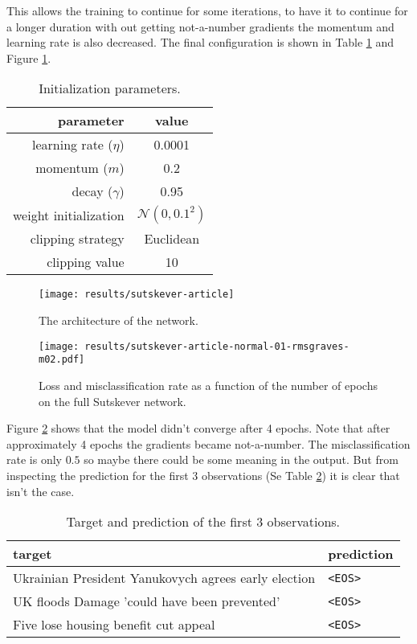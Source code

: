 This allows the training to continue for some iterations, to have it to continue for a longer duration with out getting not-a-number gradients the momentum and learning rate is also decreased. The final configuration is shown in Table \ref{fig:results:sutskever:article-parameters} and Figure \ref{fig:results:sutskever:article-artitecture}.
\begin{table}[h]
\centering
\begin{tabular}{r|c}
	parameter & value \\ \hline
	learning rate ($\eta$) & 0.0001 \\
	momentum ($m$) & 0.2 \\
	decay ($\gamma$) & 0.95 \\
	weight initialization & $\mathcal{N}(0, 0.1^2)$ \\
	clipping strategy & Euclidean \\
	clipping value & 10
\end{tabular}
\caption{Initialization parameters.}
\label{fig:results:sutskever:article-parameters}
\end{table}

\begin{figure}[h]
	\centering
	\texttt{[image: results/sutskever-article]}
	\caption{The architecture of the network.}
	\label{fig:results:sutskever:article-artitecture}
\end{figure}

\begin{figure}[H]
	\centering
	\texttt{[image: results/sutskever-article-normal-01-rmsgraves-m02.pdf]}
	\caption{Loss and misclassification rate as a function of the number of epochs on the full Sutskever network.}
	\label{fig:results:sutskever:article-learning}
\end{figure}

Figure \ref{fig:results:sutskever:article-learning} shows that the model didn't converge after 4 epochs. Note that after approximately 4 epochs the gradients became not-a-number. The misclassification rate is only $0.5$ so maybe there could be some meaning in the output. But from inspecting the prediction for the first 3 observations (Se Table \ref{fig:results:sutskever:predictions}) it is clear that isn't the case.
\begin{table}[h]
\centering
\begin{tabular}{p{9cm}|p{2cm}}
	target & prediction \\ \hline
	Ukrainian President Yanukovych agrees early election & \texttt{<EOS>} \\
	UK floods Damage 'could have been prevented' & \texttt{<EOS>} \\
	Five lose housing benefit cut appeal & \texttt{<EOS>}
\end{tabular}
\caption{Target and prediction of the first 3 observations.}
\label{fig:results:sutskever:predictions}
\end{table}

